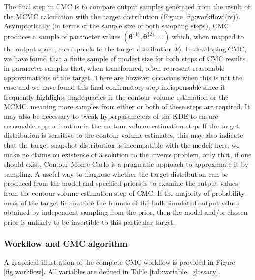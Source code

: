 The final step in CMC is to compare output samples generated from the result of the MCMC calculation with the target distribution (Figure \ref{fig:workflow}(iv)). Asymptotically (in terms of the sample size of both sampling steps), CMC produces a sample of parameter values $(\boldsymbol{\theta}^{\{1\}},\boldsymbol{\theta}^{\{2\}},...)$ which, when mapped to the output space, corresponds to the target distribution $\hat{\Psi})$. In developing CMC, we have found that a finite sample of modest size for both steps of CMC results in parameter samples that, when transformed, often represent reasonable approximations of the target. There are however occasions when this is not the case and we have found this final confirmatory step indispensable since it frequently highlights inadequacies in the contour volume estimation or the MCMC, meaning more samples from either or both of these steps are required. It may also be necessary to tweak hyperparameters of the KDE to ensure reasonable approximation in the contour volume estimation step. If the target distribution is sensitive to the contour volume estimates, this may also indicate that the target snapshot distribution is incompatible with the model: here, we make no claims on existence of a solution to the inverse problem, only that, if one should exist, Contour Monte Carlo is a pragmatic approach to approximate it by sampling. A useful way to diagnose whether the target distribution can be produced from the model and specified priors is to examine the output values from the contour volume estimation step of CMC. If the majority of probability mass of the target lies outside the bounds of the bulk simulated output values obtained by independent sampling from the prior, then the model and/or chosen prior is unlikely to be invertible to this particular target.

\subsubsection{Workflow and CMC algorithm}

A graphical illustration of the complete CMC workflow is provided in Figure \ref{fig:workflow}. All variables are defined in Table \ref{tab:variable_glossary}.


